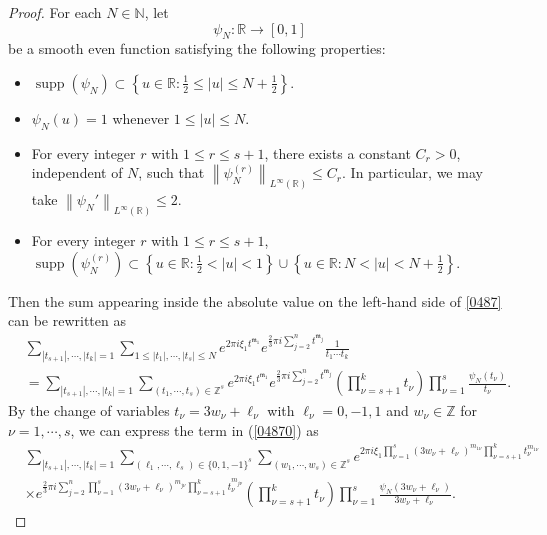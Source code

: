 \documentclass[10pt,a4paper]{amsart}
\numberwithin{equation}{section}
\begin{document}
\begin{proof}
For each $N\in\mathbb{N}$, let
\[
\psi_N:\mathbb{R}\to[0,1]
\]
be a smooth even function satisfying the following properties:
\begin{itemize}
	\item[(1)]
	$\operatorname{supp}(\psi_N)
	\subset
	\left\{
	u\in\mathbb{R}:
	\frac{1}{2}\leq |u|\leq N+\frac{1}{2}
	\right\}.$
	\item[(2)]
$\psi_N(u)=1$ whenever
	$1\leq |u|\leq N.$
	\item[(3)]
	For every integer $r$ with $1\leq r\leq s+1$, there exists
	a constant $C_r>0$, independent of $N$, such that
	$\left\|
	\psi_N^{(r)}
	\right\|_{L^\infty(\mathbb{R})}
	\leq C_r.$
	In particular, we may take
$\left\|
	\psi_N'
	\right\|_{L^\infty(\mathbb{R})}
	\leq 2.$
	\item[(4)]
	For every integer $r$ with $1\leq r\leq s+1$,
$\operatorname{supp}\!\left(\psi_N^{(r)}\right)
	\subset
	\left\{
	u\in\mathbb{R}:
	\frac{1}{2}<|u|<1
	\right\}
	\cup
	\left\{
	u\in\mathbb{R}:
	N<|u|<N+\frac{1}{2}
	\right\}.$
\end{itemize}
Then the sum appearing inside the absolute value on the left-hand side of \eqref{0487} can be rewritten as
\begin{align}\label{04870}
& \sum_{|t_{s+1}|,\cdots,|t_k|=1}\sum_{1\le |t_1|,\cdots,|t_s|\le N} e^{2\pi i \xi_1 t^{\mathfrak{m}_1}  } e^{\frac{2}{3}\pi i 
 \sum_{j=2}^n t^{\mathfrak{m}_j} } \frac{1}{t_1\cdots t_k}\nonumber \\
&= \sum_{|t_{s+1}|,\cdots,|t_k|=1}\sum_{(t_1,\cdots,t_s)\in \mathbb{Z}^s} e^{2\pi i \xi_1 t^{\mathfrak{m}_1}  } e^{\frac{2}{3}\pi i 
 \sum_{j=2}^n t^{\mathfrak{m}_j} }\left(\prod_{\nu=s+1}^k t_{\nu}\right) \prod_{\nu=1}^s\frac{\psi_N(t_\nu)}{t_\nu}. 
\end{align}
By the change of variables $t_\nu=3w_\nu+\ell_\nu$  with $\ell_\nu=0,-1,1$ and $w_\nu\in\mathbb{Z}$ for $\nu=1,\cdots,s$,   we can express the term in (\ref{04870}) as
\begin{align*}
& \sum_{|t_{s+1}|,\cdots,|t_k|=1}  \sum_{(\ell_1,\cdots,\ell_s)\in\{0,1,-1\}^s} \sum_{(w_1,\cdots,w_s)\in \mathbb{Z}^s} e^{2\pi i \xi_1  \prod_{\nu=1}^s(3w_\nu+\ell_\nu)^{m_{1\nu}} \prod_{\nu=s+1}^k t_\nu^{m_{1\nu}}  }\\
&\times e^{\frac{2}{3}\pi i 
 \sum_{j=2}^n \prod_{\nu=1}^s(3w_\nu+\ell_\nu)^{m_{j\nu}}
 \prod_{\nu=s+1}^k t_\nu^{m_{j\nu}} }\left(\prod_{\nu=s+1}^k t_{\nu} \right)\prod_{\nu=1}^s\frac{\psi_N(3w_\nu+\ell_\nu)}{3w_\nu+\ell_\nu}.
\end{align*}

\end{proof}
\end{document}
